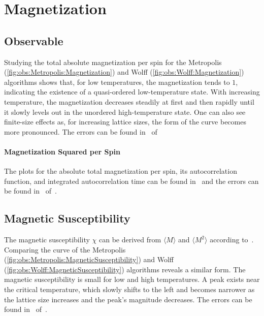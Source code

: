 \section{Magnetization}\label{sec:res:magnet}
	\subsection{Observable}\label{sec:res:magnet:observable}
		Studying the total absolute magnetization per spin for the Metropolis (\cref{fig:obs:Metropolis:Magnetization}) and Wolff (\cref{fig:obs:Wolff:Magnetization}) algorithms shows that, for low temperatures, the magnetization tends to $1$, indicating the existence of a quasi-ordered low-temperature state. With increasing temperature, the magnetization decreases steadily at first and then rapidly until it slowly levels out in the unordered high-temperature state. One can also see finite-size effects as, for increasing lattice sizes, the form of the curve becomes more pronounced. The errors can be found in~ of~
		
		\paragraph{Magnetization Squared per Spin}\label{sec:res:magnetsquare} The plots for the absolute total magnetization per spin, its autocorrelation function, and integrated autocorrelation time can be found in~ and the errors can be found in~ of~.
	
	\subsection{Magnetic Susceptibility}\label{sec:res:xs}
		The magnetic susceptibility $\chi$ can be derived from $\langle M \rangle$ and $\langle M^2 \rangle$ according to~.  Comparing the curve of the Metropolis (\cref{fig:obs:Metropolis:MagneticSusceptibility}) and Wolff (\cref{fig:obs:Wolff:MagneticSusceptibility}) algorithms reveals a similar form. The magnetic susceptibility is small for low and high temperatures. A peak exists near the critical temperature, which slowly shifts to the left and becomes narrower as the lattice size increases and the peak's magnitude decreases. The errors can be found in~ of~.
		
